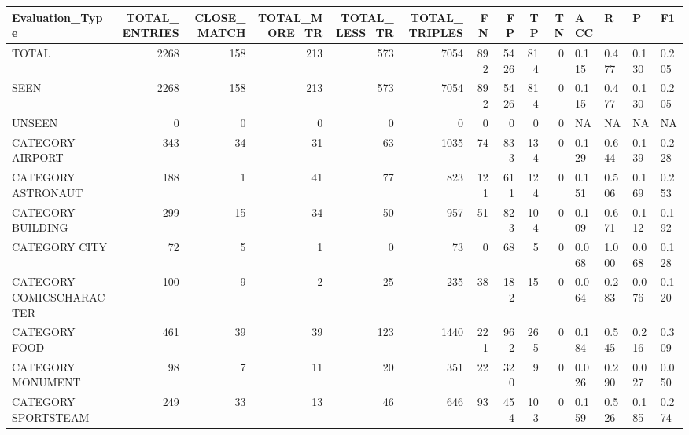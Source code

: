 \begin{tabular}{lrrrrrrrrrllll}
\hline
 Evaluation\_Type          &   TOTAL\_ENTRIES &   CLOSE\_MATCH &   TOTAL\_MORE\_TR &   TOTAL\_LESS\_TR &   TOTAL\_TRIPLES &   FN &   FP &   TP &   TN & ACC   & R     & P     & F1    \\
\hline
 TOTAL                    &            2268 &           158 &             213 &             573 &            7054 &  892 & 5426 &  814 &    0 & 0.115 & 0.477 & 0.130 & 0.205 \\
 SEEN                     &            2268 &           158 &             213 &             573 &            7054 &  892 & 5426 &  814 &    0 & 0.115 & 0.477 & 0.130 & 0.205 \\
 UNSEEN                   &               0 &             0 &               0 &               0 &               0 &    0 &    0 &    0 &    0 & NA    & NA    & NA    & NA    \\
 CATEGORY AIRPORT         &             343 &            34 &              31 &              63 &            1035 &   74 &  833 &  134 &    0 & 0.129 & 0.644 & 0.139 & 0.228 \\
 CATEGORY ASTRONAUT       &             188 &             1 &              41 &              77 &             823 &  121 &  611 &  124 &    0 & 0.151 & 0.506 & 0.169 & 0.253 \\
 CATEGORY BUILDING        &             299 &            15 &              34 &              50 &             957 &   51 &  823 &  104 &    0 & 0.109 & 0.671 & 0.112 & 0.192 \\
 CATEGORY CITY            &              72 &             5 &               1 &               0 &              73 &    0 &   68 &    5 &    0 & 0.068 & 1.000 & 0.068 & 0.128 \\
 CATEGORY COMICSCHARACTER &             100 &             9 &               2 &              25 &             235 &   38 &  182 &   15 &    0 & 0.064 & 0.283 & 0.076 & 0.120 \\
 CATEGORY FOOD            &             461 &            39 &              39 &             123 &            1440 &  221 &  962 &  265 &    0 & 0.184 & 0.545 & 0.216 & 0.309 \\
 CATEGORY MONUMENT        &              98 &             7 &              11 &              20 &             351 &   22 &  320 &    9 &    0 & 0.026 & 0.290 & 0.027 & 0.050 \\
 CATEGORY SPORTSTEAM      &             249 &            33 &              13 &              46 &             646 &   93 &  454 &  103 &    0 & 0.159 & 0.526 & 0.185 & 0.274 \\

\end{tabular}
